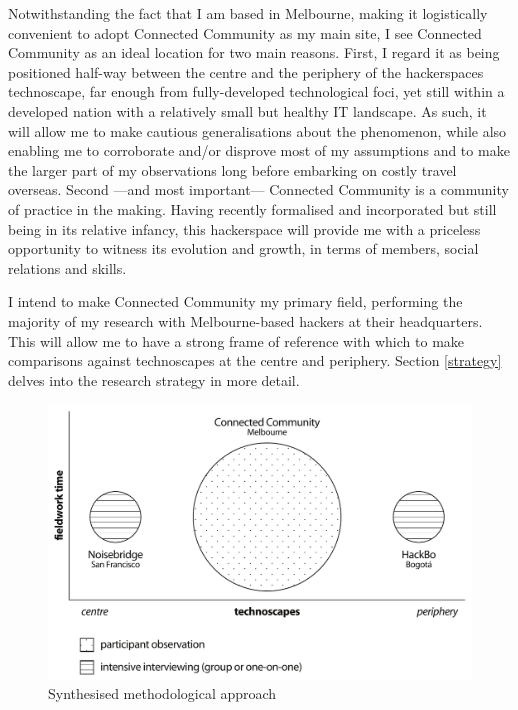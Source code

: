Notwithstanding the fact that I am based in Melbourne, making it logistically convenient to adopt Connected Community as my main site, I see Connected Community as an ideal location for two main reasons. First, I regard it as being positioned half-way between the centre and the periphery of the hackerspaces technoscape, far enough from fully-developed technological foci, yet still within a developed nation with a relatively small but healthy IT landscape. As such, it will allow me to make cautious generalisations about the phenomenon, while also enabling me to corroborate and/or disprove most of my assumptions and to make the larger part of my observations long before embarking on costly travel overseas. Second ---and most important--- Connected Community is a community of practice in the making. Having recently formalised and incorporated but still being in its relative infancy, this hackerspace will provide me with a priceless opportunity to witness its evolution and growth, in terms of members, social relations and skills.

I intend to make Connected Community my primary field, performing the majority of my research with Melbourne-based hackers at their headquarters. This will allow me to have a strong frame of reference with which to make comparisons against technoscapes at the centre and periphery. Section \ref{strategy} delves into the research strategy in more detail.

\begin{figure}[ht]
	\centering
		\includegraphics[scale=0.65,natwidth=10pt,natheight=1pt]{confirmation-report/graphs/methodology01.pdf}
	\caption[Synthesised Methodological Approach]{Synthesised methodological approach}
	\label{methodology_graph}
\end{figure}


